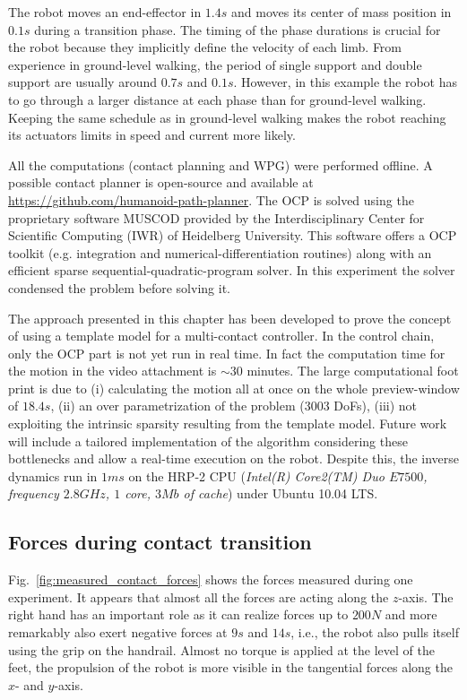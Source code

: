 The robot moves an end-effector in $ 1.4 s $ and moves its center of mass position in $ 0.1 s $ during a transition phase.
The timing of the phase durations is crucial for the robot because they implicitly define the velocity of each limb.
From experience in ground-level walking, the period of single support and double support are usually around $0.7 s$ and $0.1 s$.
However, in this example the robot has to go through a larger distance at each phase than for ground-level walking.
Keeping the same schedule as in ground-level walking makes the robot reaching its actuators limits in speed and current more likely.

All the computations (contact planning and WPG) were performed offline.
A possible contact planner is open-source and available at \url{https://github.com/humanoid-path-planner}.
The OCP is solved using the proprietary software MUSCOD provided by the Interdisciplinary Center for Scientific Computing (IWR) of Heidelberg University.
This software offers a OCP toolkit (e.g. integration and numerical-differentiation routines) along with an efficient sparse sequential-quadratic-program solver.
In this experiment the solver condensed the problem before solving it.

The approach presented in this chapter has been developed to prove the concept of using a template model for a multi-contact controller.
In the control chain, only the OCP part is not yet run in real time.
In fact the computation time for the motion in the video attachment is $\sim30$ minutes.
The large computational foot print is due to
(i) calculating the motion all at once on the whole preview-window of $18.4 s$,
(ii) an over parametrization of the problem (3003 DoFs),
(iii) not exploiting the intrinsic sparsity resulting from the template model.
Future work will include a tailored implementation of the algorithm considering these bottlenecks and allow a real-time execution on the robot.
Despite this, the inverse dynamics run in $1 ms$ on the HRP-2 CPU ({\it Intel(R) Core2(TM) Duo $E7500$, frequency $2.8 GHz$, $1$ core, $3Mb$ of cache}) under Ubuntu 10.04 LTS.
%

\subsection*{Forces during contact transition}

Fig.~\ref{fig:measured_contact_forces} shows the forces measured during one experiment.
It appears that almost all the forces are acting along the $z$-axis.
The right hand has an important role as it can realize forces up to $200 N$ and more remarkably also exert negative forces at $9 s$ and $14 s$, i.e., the robot also pulls itself using the grip on the handrail.
Almost no torque is applied at the level of the feet, the propulsion of the robot is more visible in the tangential forces along the $x$- and $y$-axis.

